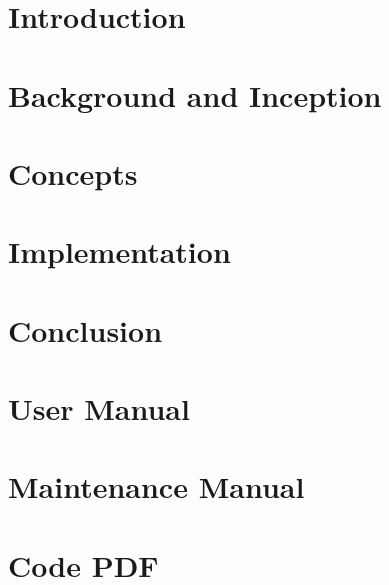 \documentclass[11pt]{report}
\begin{document}
  
  \clearpage
  \tableofcontents
  
  \chapter{Introduction}
  
  \chapter{Background and Inception}
  
  \chapter{Concepts}
  
  \chapter{Implementation}
    
  \chapter{Conclusion}
  
  \chapter{User Manual}
  
  \chapter{Maintenance Manual}
  
  \chapter{Code PDF}
  
  
  \clearpage
  \nocite{*} %
  
  
\end{document}
